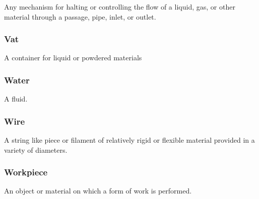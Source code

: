 Any mechanism for halting or controlling the flow of a liquid, gas, or other material through a passage, pipe, inlet, or outlet.


\subsubsection{Vat}
\label{sec:Vat}



A container for liquid or powdered materials


\subsubsection{Water}
\label{sec:Water}



A fluid.


\subsubsection{Wire}
\label{sec:Wire}



A string like piece or filament of relatively rigid or flexible material provided in a variety of diameters.


\subsubsection{Workpiece}
\label{sec:Workpiece}



An object or material on which a form of work is performed.

